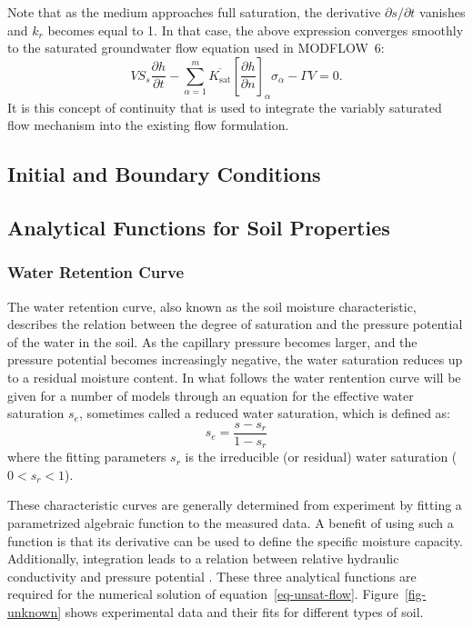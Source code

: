 \documentclass[fleqn]{article}
\begin{document}
Note that as the medium approaches full saturation, the derivative
$\partial s/ \partial t$ vanishes and $k_r$ becomes equal to 1.
In that case, the above expression converges smoothly to the saturated
groundwater flow equation used in MODFLOW~6:
\begin{equation}
  V S_s \frac{\partial h}{\partial t} -
  \sum_{\alpha=1}^{m} \overline{K_{\textrm{sat}}}
  \left[\frac{\partial h}{\partial n}\right]_\alpha \sigma_\alpha -
  \Gamma V = 0.
  \label{eq-sat-flow}
\end{equation}
It is this concept of continuity that is used to integrate the 
variably saturated flow mechanism into the existing flow formulation.


\subsection{Initial and Boundary Conditions}\label{sec-boundary-conditions}


\subsection{Analytical Functions for Soil Properties}
\subsubsection{Water Retention Curve}
The water retention curve, also known as the soil moisture
characteristic, describes the relation between the degree of saturation
and the pressure potential of the water in the soil.  As the capillary
pressure becomes larger, and the pressure potential becomes increasingly
negative, the water saturation reduces up to a residual moisture content.
In what follows the water rentention curve will be given for a number of
models through an equation for the effective water saturation $s_e$, 
sometimes called a reduced water saturation, which is defined as:
\begin{equation}
  s_e = \frac{s - s_r}{1 - s_r}
\end{equation}
where the fitting parameters $s_r$ is the irreducible (or residual) 
water saturation ($0 < s_r < 1$).

These characteristic curves are generally determined from experiment 
by fitting a parametrized algebraic function to the measured data. 
A benefit of using such a function is that its derivative can be used 
to define the specific moisture capacity. Additionally, integration 
leads to a relation between relative hydraulic conductivity and pressure potential \cite{???}. These three analytical functions are required for 
the numerical solution of equation~\ref{eq-unsat-flow}. 
Figure~\ref{fig-unknown} shows experimental data and their fits
for different types of soil.
\end{document}
